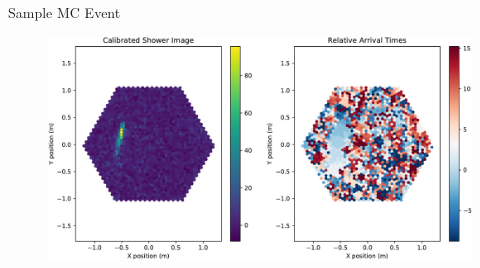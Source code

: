 \begin{frame}{Sample MC Event}
    \begin{figure}
        \includegraphics[width=0.85\linewidth]{images/cleaning_plots/raw-crop.pdf}
    \end{figure}
\end{frame}








